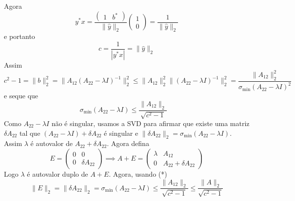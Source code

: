 \documentclass{article}
\begin{document}
Agora $$y^*x = \frac{\begin{pmatrix} 1 & b^* \end{pmatrix}}{\|\hat{y}\|_2} \begin{pmatrix} 1 \\ 0 \end{pmatrix} = \frac1{\|\hat{y}\|_2} $$ e portanto $$c = \frac{1}{|y^*x|} = {\|\hat{y}\|_2}$$
 Assim
\[ c^2 - 1 = \|b\|_2^2 = \|A_{12}(A_{22} - \lambda I)^{-1}\|_2^2 \le \|A_{12}\|_2^2 \|(A_{22} - \lambda I)^{-1}\|_2^2 = \frac{\|A_{12}\|_2^2}{\sigma_{\min}(A_{22}-\lambda I)^2} \]
e seque que 
\[ \sigma_{\min}(A_{22}-\lambda I) \le \frac{\|A_{12}\|_2}{\sqrt{c^2-1}} \quad \tag{*}\]
Como $A_{22}-\lambda I$ não é singular, usamos a SVD para afirmar que existe uma matriz $\delta A_{22}$ tal que $(A_{22}-\lambda I) + \delta A_{22}$ é singular e $\|\delta A_{22}\|_2 = \sigma_{\min}(A_{22}-\lambda I)$.
Assim $\lambda$ é autovalor de $A_{22} + \delta A_{22}$.
Agora defina
\[ E = \begin{pmatrix} 0 & 0 \\ 0 & \delta A_{22} \end{pmatrix} \implies A+E = \begin{pmatrix} \lambda & A_{12} \\ 0 & A_{22} + \delta A_{22} \end{pmatrix} \]
Logo $\lambda$ é autovalor duplo de $A+E$. Agora, usando (*)
\[ \|E\|_2 = \|\delta A_{22}\|_2 = \sigma_{\min}(A_{22}-\lambda I) \le \frac{\|A_{12}\|_2}{\sqrt{c^2-1}} \le \frac{\|A\|_2}{\sqrt{c^2-1}} \]
 
\end{document}
